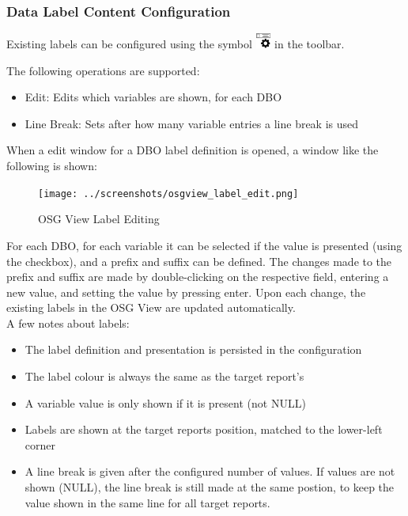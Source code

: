 \subsubsection{Data Label Content Configuration}

Existing labels can be configured using the symbol \includegraphics[width=0.5cm,frame]{../../data/icons/label_edit.png} in the toolbar.

The following operations are supported:

\begin{itemize}
 \item Edit: Edits which variables are shown, for each DBO
 \item Line Break: Sets after how many variable entries a line break is used
\end{itemize}

When a edit window for a DBO label definition is opened, a window like the following is shown:

\begin{figure}[H]
    \texttt{[image: ../screenshots/osgview\_label\_edit.png]}
  \caption{OSG View Label Editing}
\end{figure}

For each DBO, for each variable it can be selected if the value is presented (using the checkbox), and a prefix and suffix can be defined. The changes made to the prefix and suffix are made by double-clicking on the respective field, entering a new value, and setting the value by pressing enter. Upon each change, the existing labels in the OSG View are updated automatically. \\

A few notes about labels:

\begin{itemize}
 \item The label definition and presentation is persisted in the configuration
 \item The label colour is always the same as the target report's
 \item A variable value is only shown if it is present (not NULL)
 \item Labels are shown at the target reports position, matched to the lower-left corner
 \item A line break is given after the configured number of values. If values are not shown (NULL), the line break is still made at the same postion, to keep the value shown in the same line for all target reports.
\end{itemize}

